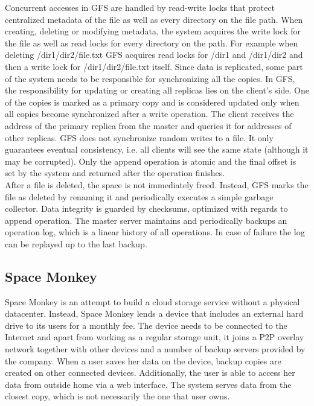 \documentclass{pracamgren}
\begin{document}
Concurrent accesses in GFS are handled by read-write locks that protect centralized metadata of the file as well as every directory on the file path. When creating, deleting or modifying metadata, the system acquires the write lock for the file as well as read locks for every directory on the path. For example when deleting /dir1/dir2/file.txt GFS acquires read locks for /dir1 and /dir1/dir2 and then a write lock for /dir1/dir2/file.txt itself. Since data is replicated, some part of the system needs to be responsible for synchronizing all the copies. In GFS, the responsibility for updating or creating all replicas lies on the client's side. One of the copies is marked as a primary copy and is considered updated only when all copies become synchronized after a write operation. The client receives the address of the primary replica from the master and queries it for addresses of other replicas. GFS does not synchronize random writes to a file. It only guarantees eventual consistency, i.e. all clients will see the same state (although it may be corrupted). Only the append operation is atomic and the final offset is set by the system and returned after the operation finishes.\\

After a file is deleted, the space is not immediately freed. Instead, GFS marks the file as deleted by renaming it and periodically executes a simple garbage collector. Data integrity is guarded by checksums, optimized with regards to append operation. The master server maintains and periodically backups an operation log, which is a linear history of all operations. In case of failure the log can be replayed up to the last backup.\\

\subsection{Space Monkey}

Space Monkey \cite{space_monkey} is an attempt to build a cloud storage service without a physical datacenter. Instead, Space Monkey lends a device that includes an external hard drive to its users for a monthly fee. The device needs to be connected to the Internet and apart from working as a regular storage unit, it joins a P2P overlay network together with other devices and a number of backup servers provided by the company. When a user saves her data on the device, backup copies are created on other connected devices. Additionally, the user is able to access her data from outside home via a web interface. The system serves data from the closest copy, which is not necessarily the one that user owns.\\
\end{document}
